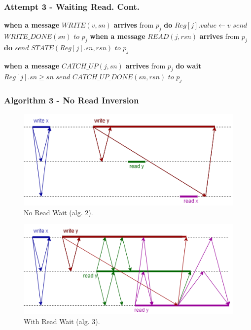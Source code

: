 \begin{frame}[fragile]
    \frametitle{Attempt 3 - Waiting Read. Cont.}
    \begin{algorithm}[H]
        \begin{algorithmic}[0]
        \STATE \textbf{when a message} $WRITE(v, sn)$ \textbf{arrives} from $p_j$ \textbf{do}
        \bindent
            \STATE $Reg[j].value \leftarrow v$
            \STATE $send$ $WRITE\_DONE(sn)$ $to$ $p_j$
        \eindent
        \STATE \textbf{when a message} $READ(j, rsn)$ \textbf{arrives} from $p_j$ \textbf{do}
        \bindent
            \STATE $send$ $STATE(Reg[j].sn, rsn)$ $to$ $p_j$
        \eindent
        
        \STATE \textbf{when a message} $CATCH\_UP(j, sn)$ \textbf{arrives} from $p_j$ \textbf{do}
        \bindent
            \STATE $\textbf{wait}$ $Reg[j].sn \geq sn$
            \STATE $send$ $CATCH\_UP\_DONE(sn, rsn)$ $to$ $p_j$
        \eindent
    \end{algorithmic}
        \caption*{}
    \end{algorithm}
\end{frame}

\begin{frame}
    \frametitle{Algorithm 3 - No Read Inversion}
    \begin{center}
        \begin{figure}
            \includegraphics[scale=.35]{resources/alg2_incorrectness.png}
            \caption*{No Read Wait (alg. 2).}
        \end{figure}
        \begin{figure}
            \includegraphics[scale=.35]{resources/alg3_no_read_inversion.png}
            \caption*{With Read Wait (alg. 3).}
        \end{figure}
    \end{center}
\end{frame}

